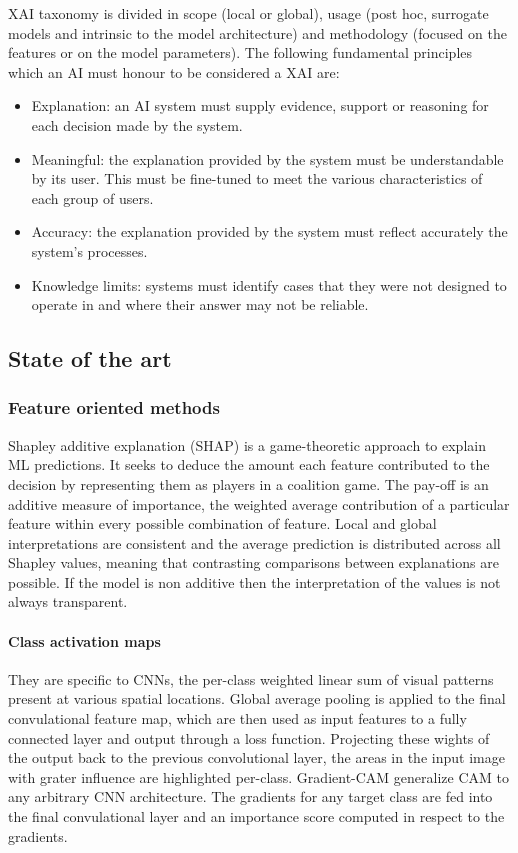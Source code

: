 	XAI taxonomy is divided in scope (local or global), usage (post hoc, surrogate models and intrinsic to the model architecture) and methodology (focused on the features or on the model parameters).
	The following fundamental principles which an AI must honour to be considered a XAI are:

	\begin{itemize}
		\item Explanation: an AI system must supply evidence, support or reasoning for each decision made by the system.
		\item Meaningful: the explanation provided by the system must be understandable by its user.
			This must be fine-tuned to meet the various characteristics of each group of users.
		\item Accuracy: the explanation provided by the system must reflect accurately the system's processes.
		\item Knowledge limits: systems must identify cases that they were not designed to operate in and where their answer may not be reliable.
	\end{itemize}

	\subsection{State of the art}

		\subsubsection{Feature oriented methods}
		Shapley additive explanation (SHAP) is a game-theoretic approach to explain ML predictions.
		It seeks to deduce the amount each feature contributed to the decision by representing them as players in a coalition game.
		The pay-off is an additive measure of importance, the weighted average contribution of a particular feature within every possible combination of feature.
		Local and global interpretations are consistent and the average prediction is distributed across all Shapley values, meaning that contrasting comparisons between explanations are possible.
		If the model is non additive then the interpretation of the values is not always transparent.

			\paragraph{Class activation maps}
			They are specific to CNNs, the per-class weighted linear sum of visual patterns present at various spatial locations.
			Global average pooling is applied to the final convulational feature map, which are then used as input features to a fully connected layer and output through a loss function.
			Projecting these wights of the output back to the previous convolutional layer, the areas in the input image with grater influence are highlighted per-class.
			Gradient-CAM generalize CAM to any arbitrary CNN architecture.
			The gradients for any target class are fed into the final convulational layer and an importance score computed in respect to the gradients.

